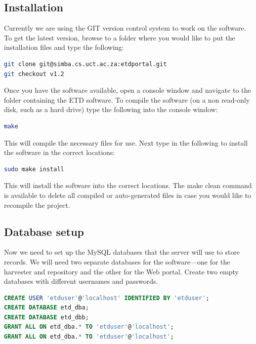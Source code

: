 \documentclass[a4paper,11pt]{article}
\begin{document}
\subsection{Installation}
\label{sec:installation_process:installation}

Currently we are using the GIT version control system to work on the software. To get the latest version, browse to a folder where you would like to put the installation files and type the following:

\begin{lstlisting}[language=bash]
git clone git@simba.cs.uct.ac.za:etdportal.git 
git checkout v1.2
\end{lstlisting}

Once you have the software available, open a console window and navigate to the folder containing the ETD software. To compile the software (on a non read-only disk, such as a hard drive) type the following into the console window: 

\begin{lstlisting}[language=bash]
make
\end{lstlisting}

This will compile the necessary files for use. Next type in the following to install the software in the correct locations: 

\begin{lstlisting}[language=bash]
sudo make install
\end{lstlisting}

This will install the software into the correct locations. The make clean command is available to delete all compiled or auto-generated files in case you would like to recompile the project.

\subsection{Database setup}
\label{sec:installation_process:database_setup}

Now we need to set up the MySQL databases that the server will use to store records. We will need two separate databases for the software---one for the harvester and repository and the other for the Web portal. Create two empty databases with different usernames and passwords. 

\begin{lstlisting}[language=SQL]
CREATE USER 'etduser'@'localhost' IDENTIFIED BY 'etduser'; 
CREATE DATABASE etd_dba; 
CREATE DATABASE etd_dbb; 
GRANT ALL ON etd_dba.* TO 'etduser'@'localhost';
GRANT ALL ON etd_dba.* TO 'etduser'@'localhost';
\end{lstlisting}
\end{document}
